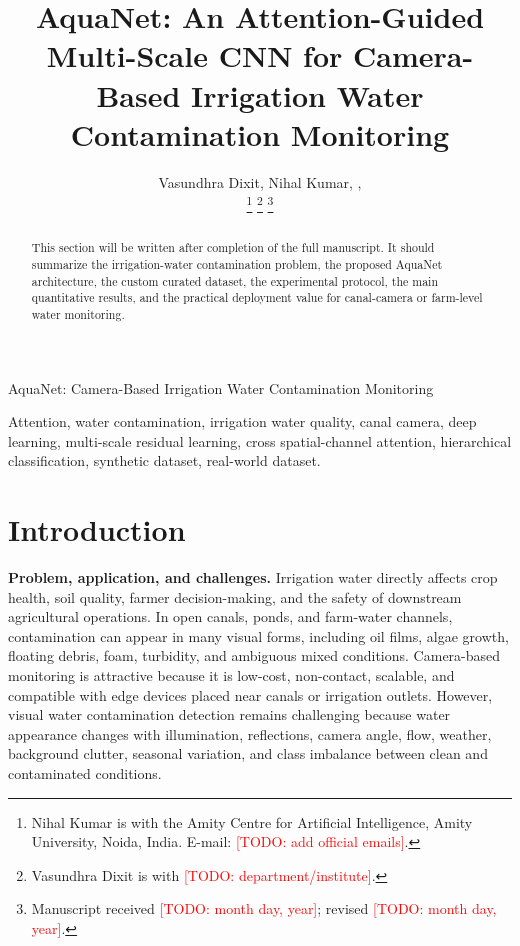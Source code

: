 \documentclass[journal]{IEEEtran}
\newcommand{\todo}[1]{\textcolor{red}{[TODO: #1]}}
\newcommand{\method}{AquaNet}
\begin{document}
\title{\method: An Attention-Guided Multi-Scale CNN for Camera-Based Irrigation Water Contamination Monitoring}

\author{
Vasundhra Dixit,
Nihal Kumar,
,

\thanks{Nihal Kumar is with the Amity Centre for Artificial Intelligence, Amity University, Noida, India. E-mail: \todo{add official emails}.}
\thanks{Vasundhra Dixit is with \todo{department/institute}.}
\thanks{Manuscript received \todo{month day, year}; revised \todo{month day, year}.}
}

%
{\method: Camera-Based Irrigation Water Contamination Monitoring}

\maketitle

\begin{abstract}
This section will be written after completion of the full manuscript. It should summarize the irrigation-water contamination problem, the proposed \method{} architecture, the custom curated dataset, the experimental protocol, the main quantitative results, and the practical deployment value for canal-camera or farm-level water monitoring.
\end{abstract}

\begin{IEEEkeywords}
Attention, water contamination, irrigation water quality, canal camera, deep learning, multi-scale residual learning, cross spatial-channel attention, hierarchical classification, synthetic dataset, real-world dataset.
\end{IEEEkeywords}

\section{Introduction}
\label{sec:introduction}

\textbf{Problem, application, and challenges.}
Irrigation water directly affects crop health, soil quality, farmer decision-making, and the safety of downstream agricultural operations. In open canals, ponds, and farm-water channels, contamination can appear in many visual forms, including oil films, algae growth, floating debris, foam, turbidity, and ambiguous mixed conditions. Camera-based monitoring is attractive because it is low-cost, non-contact, scalable, and compatible with edge devices placed near canals or irrigation outlets. However, visual water contamination detection remains challenging because water appearance changes with illumination, reflections, camera angle, flow, weather, background clutter, seasonal variation, and class imbalance between clean and contaminated conditions. 
\end{document}
